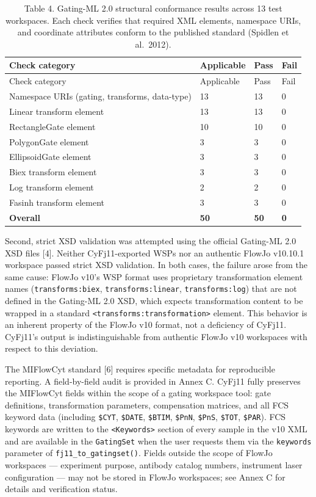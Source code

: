 \documentclass[
]{article}
\begin{document}
\begin{longtable}[]{@{}llll@{}}
\caption{Table 4. Gating-ML 2.0 structural conformance results across 13
test workspaces. Each check verifies that required XML elements,
namespace URIs, and coordinate attributes conform to the published
standard (Spidlen et al.~2012).}\tabularnewline
\toprule\noalign{}
Check category & Applicable & Pass & Fail \\
\midrule\noalign{}
\endfirsthead
\toprule\noalign{}
Check category & Applicable & Pass & Fail \\
\midrule\noalign{}
\endhead
\bottomrule\noalign{}
\endlastfoot
Namespace URIs (gating, transforms, data-type) & 13 & 13 & 0 \\
Linear transform element & 13 & 13 & 0 \\
RectangleGate element & 10 & 10 & 0 \\
PolygonGate element & 3 & 3 & 0 \\
EllipsoidGate element & 3 & 3 & 0 \\
Biex transform element & 3 & 3 & 0 \\
Log transform element & 2 & 2 & 0 \\
Fasinh transform element & 3 & 3 & 0 \\
\textbf{Overall} & \textbf{50} & \textbf{50} & \textbf{0} \\
\end{longtable}

Second, strict XSD validation was attempted using the official Gating-ML
2.0 XSD files {[}4{]}. Neither CyFj11-exported WSPs nor an authentic
FlowJo v10.10.1 workspace passed strict XSD validation. In both cases,
the failure arose from the same cause: FlowJo v10's WSP format uses
proprietary transformation element names (\texttt{transforms:biex},
\texttt{transforms:linear}, \texttt{transforms:log}) that are not
defined in the Gating-ML 2.0 XSD, which expects transformation content
to be wrapped in a standard
\texttt{\textless{}transforms:transformation\textgreater{}} element.
This behavior is an inherent property of the FlowJo v10 format, not a
deficiency of CyFj11. CyFj11's output is indistinguishable from
authentic FlowJo v10 workspaces with respect to this deviation.

The MIFlowCyt standard {[}6{]} requires specific metadata for
reproducible reporting. A field-by-field audit is provided in Annex C.
CyFj11 fully preserves the MIFlowCyt fields within the scope of a gating
workspace tool: gate definitions, transformation parameters,
compensation matrices, and all FCS keyword data (including
\texttt{\$CYT}, \texttt{\$DATE}, \texttt{\$BTIM}, \texttt{\$PnN},
\texttt{\$PnS}, \texttt{\$TOT}, \texttt{\$PAR}). FCS keywords are
written to the \texttt{\textless{}Keywords\textgreater{}} section of
every sample in the v10 XML and are available in the \texttt{GatingSet}
when the user requests them via the \texttt{keywords} parameter of
\texttt{fj11\_to\_gatingset()}. Fields outside the scope of FlowJo
workspaces --- experiment purpose, antibody catalog numbers, instrument
laser configuration ---
\textcolor{pending}{may not be stored in FlowJo workspaces; see Annex C for details and verification status}.
\end{document}
